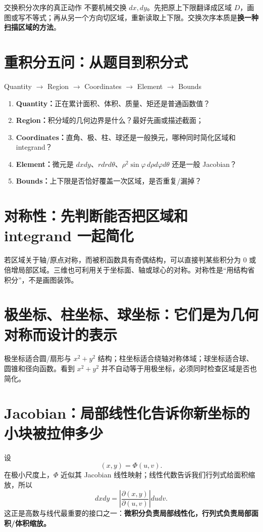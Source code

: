 \documentclass[11pt,a4paper,openany]{ctexbook}
\newcommand{\key}[1]{\textbf{\color{deep}#1}}
\begin{document}
\begin{examBox}{交换积分次序的真正动作}
不要机械交换 $dx,dy$。先把原上下限翻译成区域 $D$，画图或写不等式；再从另一个方向切区域，重新读取上下限。交换次序本质是\key{换一种扫描区域的方法}。
\end{examBox}

\section{重积分五问：从题目到积分式}
\begin{corebox}{Quantity $\to$ Region $\to$ Coordinates $\to$ Element $\to$ Bounds}
\begin{enumerate}
  \item \key{Quantity：}正在累计面积、体积、质量、矩还是普通函数值？
  \item \key{Region：}积分域的几何边界是什么？最好先画或描述截面；
  \item \key{Coordinates：}直角、极、柱、球还是一般换元，哪种同时简化区域和 integrand？
  \item \key{Element：}微元是 $dxdy$、$rdrd\theta$、$\rho^2\sin\varphi\,d\rho d\varphi d\theta$ 还是一般 Jacobian？
  \item \key{Bounds：}上下限是否恰好覆盖一次区域，是否重复/漏掉？
\end{enumerate}
\end{corebox}

\section{对称性：先判断能否把区域和 integrand 一起简化}
若区域关于轴/原点对称，而被积函数具有奇偶结构，可以直接判某些积分为 0 或倍增局部区域。三维也可利用关于坐标面、轴或球心的对称。对称性是“用结构省积分”，不是画图装饰。

\section{极坐标、柱坐标、球坐标：它们是为几何对称而设计的表示}
极坐标适合圆/扇形与 $x^2+y^2$ 结构；柱坐标适合绕轴对称体域；球坐标适合球、圆锥和径向函数。看到 $x^2+y^2$ 并不自动等于用极坐标，必须同时检查区域是否也简化。

\section{Jacobian：局部线性化告诉你新坐标的小块被拉伸多少}
设
\[
(x,y)=\Phi(u,v).
\]
在极小尺度上，$\Phi$ 近似其 Jacobian 线性映射；线性代数告诉我们行列式给面积缩放，所以
\[
\boxed{dxdy=\left|\frac{\partial(x,y)}{\partial(u,v)}\right|dudv}.
\]
这正是高数与线代最重要的接口之一：\key{微积分负责局部线性化，行列式负责局部面积/体积缩放。}
\end{document}
